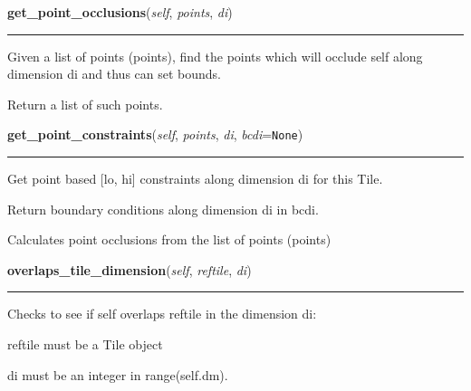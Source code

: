     \vspace{0.5ex}

\hspace{.8\funcindent}\begin{boxedminipage}{\funcwidth}

    \raggedright \textbf{get\_point\_occlusions}(\textit{self}, \textit{points}, \textit{di})

    \vspace{-1.5ex}

    \rule{\textwidth}{0.5\fboxrule}
\setlength{\parskip}{2ex}
    Given a list of points (points), find the points which will occlude 
    self along dimension di and thus can set bounds.

    Return a list of such points.

\setlength{\parskip}{1ex}
    \end{boxedminipage}

    \label{Tiling:Tile:get_point_constraints}

    \vspace{0.5ex}

\hspace{.8\funcindent}\begin{boxedminipage}{\funcwidth}

    \raggedright \textbf{get\_point\_constraints}(\textit{self}, \textit{points}, \textit{di}, \textit{bcdi}={\tt None})

    \vspace{-1.5ex}

    \rule{\textwidth}{0.5\fboxrule}
\setlength{\parskip}{2ex}
    Get point based [lo, hi] constraints along dimension di for this Tile.

    Return boundary conditions along dimension di in bcdi.

    Calculates point occlusions from the list of points (points)

\setlength{\parskip}{1ex}
    \end{boxedminipage}

    \label{Tiling:Tile:overlaps_tile_dimension}

    \vspace{0.5ex}

\hspace{.8\funcindent}\begin{boxedminipage}{\funcwidth}

    \raggedright \textbf{overlaps\_tile\_dimension}(\textit{self}, \textit{reftile}, \textit{di})

    \vspace{-1.5ex}

    \rule{\textwidth}{0.5\fboxrule}
\setlength{\parskip}{2ex}
    Checks to see if self overlaps reftile in the dimension di:

    reftile must be a Tile object

    di must be an integer in range(self.dm).

\setlength{\parskip}{1ex}
    \end{boxedminipage}

